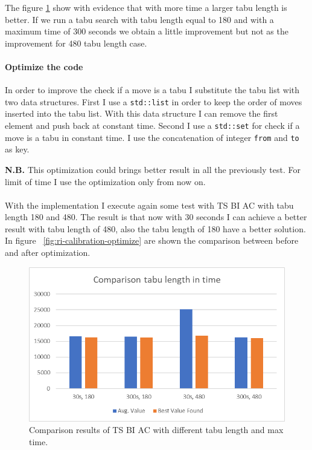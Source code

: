 			The figure \ref{fig:ri-calibration-tabulengthintime} show with evidence that with more time a larger tabu length is better. If we run a tabu search with tabu length equal to 180 and with a maximum time of 300 seconds we obtain a little improvement but not as the improvement for 480 tabu length case.
			
			\paragraph*{Optimize the code} In order to improve the check if a move is a tabu I substitute the tabu list with two data structures. First I use a \verb|std::list| in order to keep the order of moves inserted into the tabu list. With this data structure I can remove the first element and push back at constant time.
			Second I use a \verb|std::set| for check if a move is a tabu in constant time. I use the concatenation of integer \verb|from| and \verb|to| as key.
			
			\textbf{N.B.} This optimization could brings better result in all the previously test. For limit of time I use the optimization only from now on.
			
			\paragraph*{} With the implementation I execute again some test with TS BI AC with tabu length 180 and 480. The result is that now with 30 seconds I can achieve a better result with tabu length of 480, also the tabu length of 180 have a better solution. In figure ~\ref{fig:ri-calibration-optimize} are shown the comparison between before and after optimization. 
			
			
\newpage		
	
			\begin{figure}
				\centering
				\includegraphics[width=\linewidth]{img/RI-calibration-TabuLengthInTime}
				\caption{Comparison results of TS BI AC with different tabu length and max time.}
				\label{fig:ri-calibration-tabulengthintime}
			\end{figure}
		

